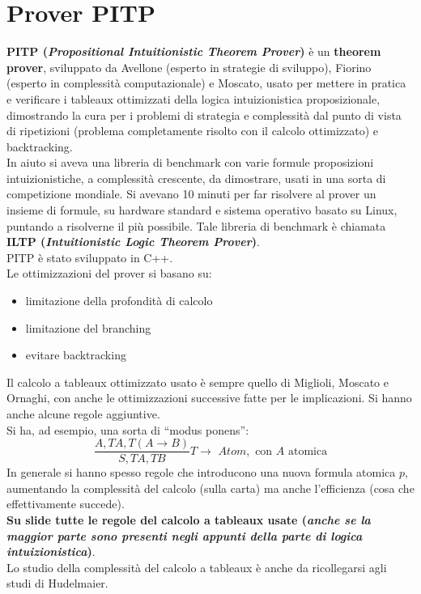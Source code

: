 \documentclass[a4paper,12pt, oneside]{book}
\begin{document}
\chapter{Prover PITP}
\textbf{PITP (\textit{Propositional Intuitionistic Theorem Prover})} è un
\textbf{theorem prover}, sviluppato da Avellone (esperto in 
strategie di sviluppo), Fiorino (esperto in complessità computazionale) e
Moscato, usato per mettere in pratica e verificare i tableaux ottimizzati della
logica intuizionistica proposizionale, dimostrando la cura per i problemi di
strategia e complessità dal punto di vista di ripetizioni (problema
completamente risolto con il calcolo ottimizzato) e backtracking. \\
In aiuto si aveva una libreria di benchmark con varie formule proposizioni
intuizionistiche, a complessità crescente, da dimostrare, usati in una sorta di
competizione mondiale. Si avevano 10 minuti per far risolvere al prover un
insieme di formule, su hardware standard e sistema operativo basato su
Linux, puntando a risolverne il più possibile. Tale libreria di benchmark è
chiamata \textbf{ILTP (\textit{Intuitionistic Logic Theorem Prover})}.\\
PITP è stato sviluppato in C++.\\
Le ottimizzazioni del prover si basano su:
\begin{itemize}
  \item limitazione della profondità di calcolo
  \item limitazione del branching
  \item evitare backtracking
\end{itemize}
Il calcolo a tableaux ottimizzato usato è sempre quello di Miglioli, Moscato e
Ornaghi, con anche le ottimizzazioni successive fatte per le implicazioni. Si
hanno anche alcune regole aggiuntive.\\
Si ha, ad esempio, una sorta di ``modus ponens'':
\[\frac{A,TA, T(A\to B)}{S,TA,TB}T\to\,\,Atom,\mbox{ con $A$ atomica}\]
In generale si hanno spesso regole che introducono una nuova formula atomica
$p$, aumentando la complessità del calcolo (sulla carta) ma anche l'efficienza
(cosa che effettivamente succede).\\
\textbf{Su slide tutte le regole del calcolo a tableaux usate (\textit{anche se
    la maggior parte sono presenti negli appunti della parte di logica
    intuizionistica})}.\\ 
Lo studio della complessità del calcolo a tableaux è anche da ricollegarsi agli
studi di Hudelmaier.\\
\end{document}
